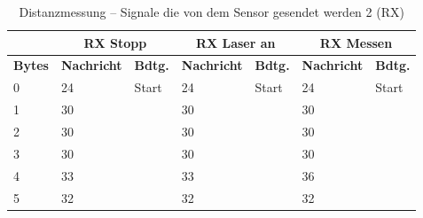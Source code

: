 \pagebreak[1]
\begin{table}[!ht]
	\centering
	\caption{Distanzmessung – Signale die von dem Sensor gesendet werden 2 (RX)}
	\label{Steuerung:tab:RX2}
	\begin{tabular}{lllllll}
		\hline
		                        & \multicolumn{2}{c}{RX Stopp} & \multicolumn{2}{c}{RX Laser an}                    & \multicolumn{2}{c}{RX Messen}                                                                                                                                    \\ \hline
		\textbf{Bytes}          & \textbf{Nachricht}           & \textbf{Bdtg.}                                     & \textbf{Nachricht}            & \textbf{Bdtg.}                                     & \textbf{Nachricht}         & \textbf{Bdtg.}                                 \\ \hline
		\multicolumn{1}{l|}{0}  & \cellcolor[HTML]{9AFF99}24   & \multicolumn{1}{l|}{\cellcolor[HTML]{9AFF99}Start} & \cellcolor[HTML]{9AFF99}24    & \multicolumn{1}{l|}{\cellcolor[HTML]{9AFF99}Start} & \cellcolor[HTML]{9AFF99}24 & \cellcolor[HTML]{9AFF99}Start                  \\
		\multicolumn{1}{l|}{1}  & \cellcolor[HTML]{F8FF00}30   & \multicolumn{1}{l|}{\cellcolor[HTML]{F8FF00}}      & \cellcolor[HTML]{F8FF00}30    & \multicolumn{1}{l|}{\cellcolor[HTML]{F8FF00}}      & \cellcolor[HTML]{F8FF00}30 & \cellcolor[HTML]{F8FF00}                       \\
		\multicolumn{1}{l|}{2}  & \cellcolor[HTML]{F8FF00}30   & \multicolumn{1}{l|}{\cellcolor[HTML]{F8FF00}}      & \cellcolor[HTML]{F8FF00}30    & \multicolumn{1}{l|}{\cellcolor[HTML]{F8FF00}}      & \cellcolor[HTML]{F8FF00}30 & \cellcolor[HTML]{F8FF00}                       \\
		\multicolumn{1}{l|}{3}  & \cellcolor[HTML]{F8FF00}30   & \multicolumn{1}{l|}{\cellcolor[HTML]{F8FF00}}      & \cellcolor[HTML]{F8FF00}30    & \multicolumn{1}{l|}{\cellcolor[HTML]{F8FF00}}      & \cellcolor[HTML]{F8FF00}30 & \cellcolor[HTML]{F8FF00}                       \\
		\multicolumn{1}{l|}{4}  & 33                           & \multicolumn{1}{l|}{}                              & 33                            & \multicolumn{1}{l|}{}                              & \cellcolor[HTML]{FFCC67}36 &                                                \\
		\multicolumn{1}{l|}{5}  & 32                           & \multicolumn{1}{l|}{}                              & 32                            & \multicolumn{1}{l|}{}                              & \cellcolor[HTML]{FFCC67}32 &                                                \\

\end{tabular}
\end{table}
